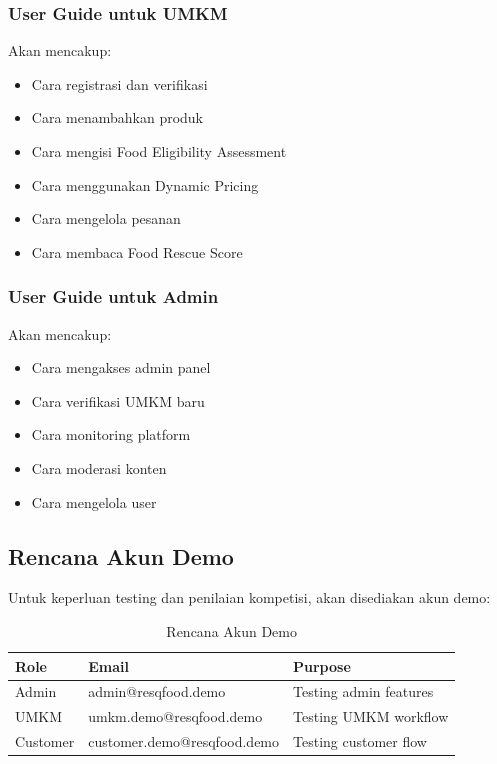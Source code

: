 \subsubsection{User Guide untuk UMKM}
Akan mencakup:
\begin{itemize}[leftmargin=*]
    \item Cara registrasi dan verifikasi
    \item Cara menambahkan produk
    \item Cara mengisi Food Eligibility Assessment
    \item Cara menggunakan Dynamic Pricing
    \item Cara mengelola pesanan
    \item Cara membaca Food Rescue Score
\end{itemize}

\subsubsection{User Guide untuk Admin}
Akan mencakup:
\begin{itemize}[leftmargin=*]
    \item Cara mengakses admin panel
    \item Cara verifikasi UMKM baru
    \item Cara monitoring platform
    \item Cara moderasi konten
    \item Cara mengelola user
\end{itemize}

\subsection{Rencana Akun Demo}

Untuk keperluan testing dan penilaian kompetisi, akan disediakan akun demo:

\begin{table}[H]
\centering
\caption{Rencana Akun Demo}
\label{tab:akun_demo}
\begin{tabularx}{\textwidth}{|l|X|X|}
\hline
\textbf{Role} & \textbf{Email} & \textbf{Purpose} \\
\hline
Admin & admin@resqfood.demo & Testing admin features \\
\hline
UMKM & umkm.demo@resqfood.demo & Testing UMKM workflow \\
\hline
Customer & customer.demo@resqfood.demo & Testing customer flow \\
\hline
\end{tabularx}
\end{table}

